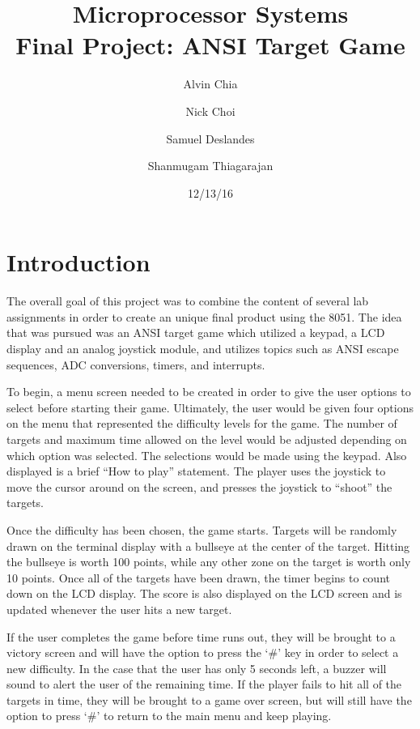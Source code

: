 \documentclass[12pt]{article}
\begin{document}
\title{Microprocessor Systems\\ Final Project: ANSI Target Game}
\author{Alvin Chia \and Nick Choi \and Samuel Deslandes \and Shanmugam Thiagarajan}
\date{12/13/16}
\maketitle
\pagebreak

\section{Introduction}
The overall goal of this project was to combine the content of several lab assignments in order to create an unique final product using the 8051. The idea that was pursued was an ANSI target game which utilized a keypad, a LCD display and an analog joystick module, and utilizes topics such as ANSI escape sequences, ADC conversions, timers, and interrupts. 

To begin, a menu screen needed to be created in order to give the user options to select before starting their game. Ultimately, the user would be given four options on the menu that represented the difficulty levels for the game. The number of targets and maximum time allowed on the level would be adjusted depending on which option was selected. The selections would be made using the keypad. Also displayed is a brief ``How to play'' statement. The player uses the joystick to move the cursor around on the screen, and presses the joystick to ``shoot'' the targets. 

Once the difficulty has been chosen, the game starts. Targets will be randomly drawn on the terminal display with a bullseye at the center of the target. Hitting the bullseye is worth 100 points, while any other zone on the target is worth only 10 points. Once all of the targets have been drawn, the timer begins to count down on the LCD display. The score is also displayed on the LCD screen and is updated whenever the user hits a new target. 

If the user completes the game before time runs out, they will be brought to a victory screen and will have the option to press the `\#' key in order to select a new difficulty. In the case that the user has only 5 seconds left, a buzzer will sound to alert the user of the remaining time. If the player fails to hit all of the targets in time, they will be brought to a game over screen, but will still have the option to press `\#' to return to the main menu and keep playing. 
\end{document}

